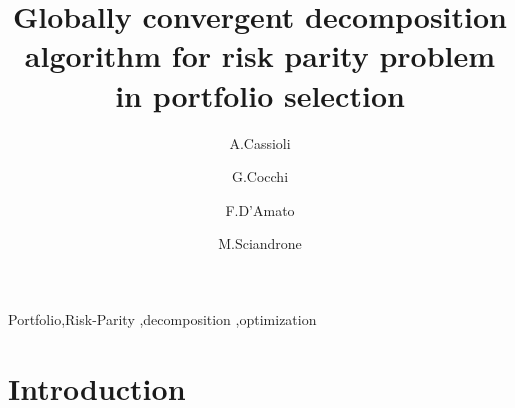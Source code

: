 \documentclass[preprint,12pt]{elsarticle}
\begin{document}
\begin{frontmatter}



\title{Globally convergent decomposition algorithm for risk parity problem in portfolio selection}


\author[cassioli]{A.Cassioli}
\author[cocchi]{G.Cocchi}
\author[damato]{F.D'Amato}
\author[sciandrone]{M.Sciandrone}

\address[cassioli]{andrea.cassioli@mosek.com}
\address[cocchi]{guido.cocchi@unifi.it}
\address[damato]{federico.damato@stud.unifi.it}
\address[sciandrone]{marco.sciandrone@iasi.cnr.it}
\begin{abstract}

\end{abstract}

\begin{keyword}
Portfolio\sep Risk-Parity \sep decomposition \sep optimization



\end{keyword}

\end{frontmatter}


\section{Introduction}

\clearpage
\end{document}

